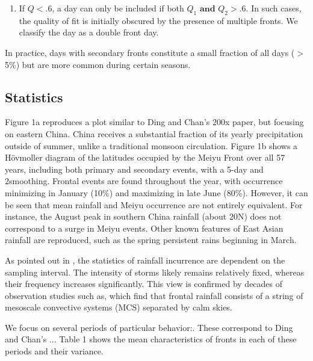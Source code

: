\documentclass[draft,grl]{AGUTeX}
\begin{document}
\begin{article}
\begin{enumerate}
		\item If $Q<.6$, a day can only be included if both $Q_1 \mathrm{\textbf{ and }} Q_2 > .6$. In such cases, the quality of fit is initially obscured by the presence of multiple fronts. We classify the day as a double front day.
	\end{enumerate}	
		
	In practice, days with secondary fronts constitute a small fraction of all days ($>$ 5\%) but are more common during certain seasons.
	
\subsection{Statistics}	

	Figure 1a reproduces a plot similar to Ding and Chan's 200x paper, but focusing on eastern China. China receives a substantial fraction of its yearly precipitation outside of summer, unlike a traditional monsoon circulation. Figure 1b shows a H\"ovmoller diagram of the latitudes occupied by the Meiyu Front over all 57 years, including both primary and secondary events, with a 5-day and 2\textdegree smoothing. Frontal events are found throughout the year, with occurrence minimizing in January (10\%) and maximizing in late June (80\%). However, it can be seen that mean rainfall and Meiyu occurrence are not entirely equivalent. For instance, the August peak in southern China rainfall (about 20\textdegree N) does not correspond to a surge in Meiyu events. Other known features of East Asian rainfall are reproduced, such as the spring persistent rains beginning in March.
	
	As pointed out in \citet{Biasutti2011}, the statistics of rainfall incurrence are dependent on the sampling interval. The intensity of storms likely remains relatively fixed, whereas their frequency increases significantly. This view is confirmed by decades of observation studies such as\citet{Murakami1984}, which find that frontal rainfall consists of a string of mesoscale convective systems (MCS) separated by calm skies.
	
	We focus on several periods of particular behavior:. These correspond to Ding and Chan's ... Table 1 shows the mean characteristics of fronts in each of these periods and their variance.
	

\end{article}
\end{document}
